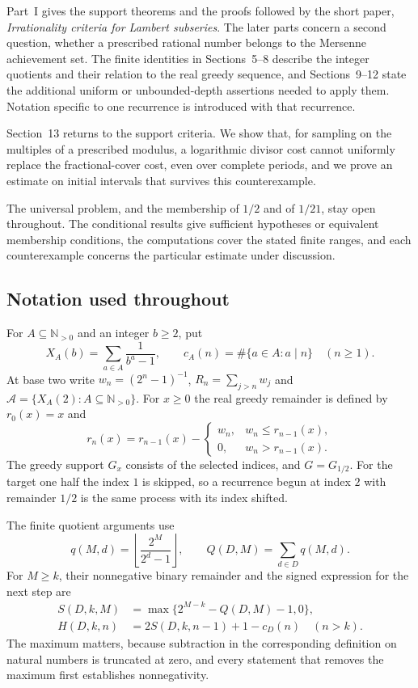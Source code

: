 \documentclass[11pt]{article}
\theoremstyle{plain}
\theoremstyle{definition}
\theoremstyle{remark}
\begin{document}
Part~I gives the support theorems and the proofs followed by the short
paper, \emph{Irrationality criteria for Lambert subseries}. The later
parts concern a second question, whether a prescribed rational number
belongs to the Mersenne achievement set. The finite identities in
Sections~5--8 describe the integer quotients and their relation to the
real greedy sequence, and Sections~9--12 state the additional uniform
or unbounded-depth assertions needed to apply them. Notation specific
to one recurrence is introduced with that recurrence.

Section~13 returns to the support criteria. We show that, for sampling
on the multiples of a prescribed modulus, a logarithmic divisor cost
cannot uniformly replace the fractional-cover cost, even over complete
periods, and we prove an estimate on initial intervals that survives
this counterexample.

The universal problem, and the membership of $1/2$ and of $1/21$, stay
open throughout. The conditional results give sufficient hypotheses or
equivalent membership conditions, the computations cover the stated
finite ranges, and each counterexample concerns the particular estimate
under discussion.

\subsection*{Notation used throughout}
For $A\subseteq\mathbb N_{>0}$ and an integer $b\ge2$, put
\[
 X_A(b)=\sum_{a\in A}\frac1{b^a-1},\qquad
 c_A(n)=\#\{a\in A:a\mid n\}\quad(n\ge1).
\]
At base two write $w_n=(2^n-1)^{-1}$, $R_n=\sum_{j>n}w_j$ and
$\mathcal A=\{X_A(2):A\subseteq\mathbb N_{>0}\}$.  For $x\ge0$ the
real greedy remainder is defined by $r_0(x)=x$ and
\[
 r_n(x)=r_{n-1}(x)-\begin{cases}
 w_n,&w_n\le r_{n-1}(x),\\
 0,&w_n>r_{n-1}(x).
 \end{cases}
\]
The greedy support $G_x$ consists of the selected indices, and
$G=G_{1/2}$. For the target one half the index $1$ is skipped, so a
recurrence begun at index $2$ with remainder $1/2$ is the same process
with its index shifted.

The finite quotient arguments use
\[
 q(M,d)=\left\lfloor\frac{2^M}{2^d-1}\right\rfloor,\qquad
 Q(D,M)=\sum_{d\in D}q(M,d).
\]
For $M\ge k$, their nonnegative binary remainder and the signed
expression for the next step are
\[
 \begin{aligned}
 S(D,k,M)&=\max\{2^{M-k}-Q(D,M)-1,0\},\\
 H(D,k,n)&=2S(D,k,n-1)+1-c_D(n)\quad(n>k).
 \end{aligned}
\]
The maximum matters, because subtraction in the corresponding
definition on natural numbers is truncated at zero, and every statement
that removes the maximum first establishes nonnegativity.
\end{document}
